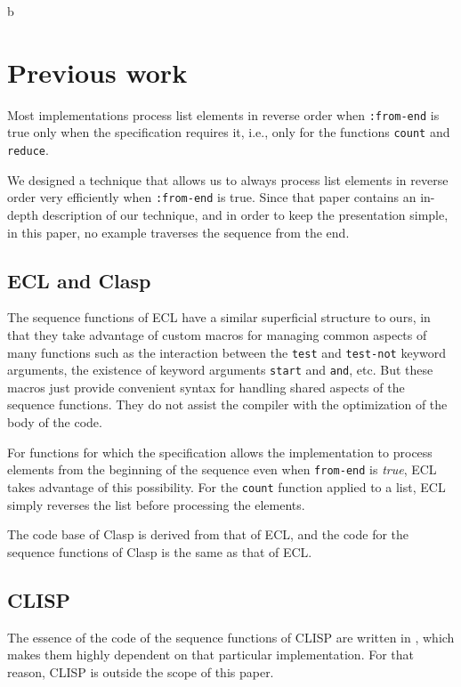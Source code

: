 b\section{Previous work}

Most implementations process list elements in reverse order when
\texttt{:from-end} is true only when the specification requires it,
i.e., only for the functions \texttt{count} and \texttt{reduce}.

We designed a technique \cite{Durand:2015:ELS:reverse} that allows us
to always process list elements in reverse order very efficiently when
\texttt{:from-end} is true.  Since that paper contains an in-depth
description of our technique, and in order to keep the presentation
simple, in this paper, no example traverses the sequence from the
end.

\subsection{ECL and Clasp}

The sequence functions of ECL have a similar superficial structure to
ours, in that they take advantage of custom macros for managing common
aspects of many functions such as the interaction between the
\texttt{test} and \texttt{test-not} keyword arguments, the existence
of keyword arguments \texttt{start} and \texttt{and}, etc.
But these macros just provide convenient syntax for handling shared
aspects of the sequence functions.  They do not assist the compiler
with the optimization of the body of the code.

For functions for which the \commonlisp{} specification allows the
implementation to process elements from the beginning of the sequence
even when \texttt{from-end} is \emph{true}, ECL takes advantage of
this possibility.  For the \texttt{count} function applied to a list,
ECL simply reverses the list before processing the elements.

The \commonlisp{} code base of Clasp is derived from that of ECL, and
the code for the sequence functions of Clasp is the same as that of
ECL.

\subsection{CLISP}

The essence of the code of the sequence functions of CLISP are written
in \clanguage{}, which makes them highly dependent on that particular
implementation.  For that reason, CLISP is outside the scope of this
paper.

